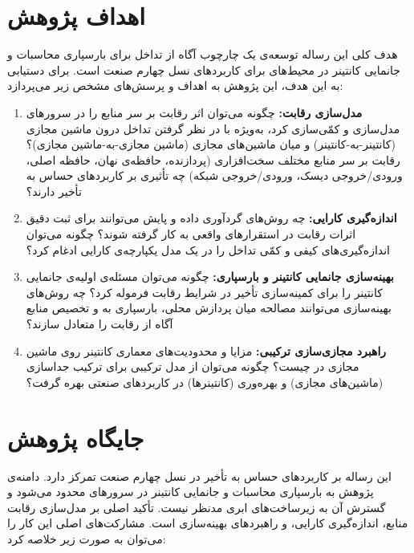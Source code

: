 \section{اهداف پژوهش}

هدف کلی این رساله توسعه‌ی یک چارچوب آگاه از تداخل برای بارسپاری محاسبات و جانمایی کانتینر در محیط‌های  برای کاربردهای نسل چهارم صنعت است. برای دستیابی به این هدف، این پژوهش به اهداف و پرسش‌های مشخص زیر می‌پردازد:

\begin{enumerate}
\item
\textbf{مدل‌سازی رقابت:}
چگونه می‌توان اثر رقابت بر سر منابع را در سرورهای  مدل‌سازی و کمّی‌سازی کرد، به‌ویژه با در نظر گرفتن تداخل درون ماشین مجازی (کانتینر-به-کانتینر) و میان ماشین‌های مجازی (ماشین مجازی-به-ماشین مجازی)؟
رقابت بر سر منابع مختلف سخت‌افزاری (پردازنده، حافظه‌ی نهان، حافظه اصلی، ورودی/خروجی دیسک، ورودی/خروجی شبکه) چه تأثیری بر کاربردهای حساس به تأخیر دارند؟

\item
\textbf{اندازه‌گیری کارایی:}
چه روش‌های گردآوری داده و پایش می‌توانند برای ثبت دقیق اثرات رقابت در استقرارهای واقعی  به کار گرفته شوند؟
چگونه می‌توان اندازه‌گیری‌های کیفی و کمّی تداخل را در یک مدل یکپارچه‌ی کارایی ادغام کرد؟

\item
\textbf{بهینه‌سازی جانمایی کانتینر و بارسپاری:}
چگونه می‌توان مسئله‌ی اولیه‌ی جانمایی کانتینر را برای کمینه‌سازی تأخیر در شرایط رقابت فرموله کرد؟
چه روش‌های بهینه‌سازی می‌توانند مصالحه میان پردازش محلی، بارسپاری به  و تخصیص منابع آگاه از رقابت را متعادل سازند؟

\item
\textbf{راهبرد مجازی‌سازی ترکیبی:}
مزایا و محدودیت‌های معماری کانتینر روی ماشین مجازی در  چیست؟
چگونه می‌توان از مدل ترکیبی برای ترکیب جداسازی (ماشین‌های مجازی) و بهره‌وری (کانتینرها) در کاربردهای صنعتی بهره گرفت؟

\end{enumerate}

\section{جایگاه پژوهش}

این رساله بر کاربردهای حساس به تأخیر در نسل چهارم صنعت تمرکز دارد. دامنه‌ی پژوهش به بارسپاری محاسبات و جانمایی کانتینر در سرورهای  محدود می‌شود و گسترش آن به زیرساخت‌های ابری مدنظر نیست. تأکید اصلی بر مدل‌سازی رقابت منابع، اندازه‌گیری کارایی، و راهبردهای بهینه‌سازی است.
مشارکت‌های اصلی این کار را می‌توان به صورت زیر خلاصه کرد:

